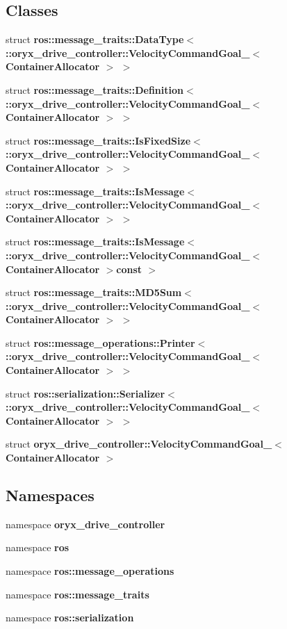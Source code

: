 \subsection*{\-Classes}
\begin{DoxyCompactItemize}
\item 
struct {\bf ros\-::message\-\_\-traits\-::\-Data\-Type$<$ \-::oryx\-\_\-drive\-\_\-controller\-::\-Velocity\-Command\-Goal\-\_\-$<$ Container\-Allocator $>$ $>$}
\item 
struct {\bf ros\-::message\-\_\-traits\-::\-Definition$<$ \-::oryx\-\_\-drive\-\_\-controller\-::\-Velocity\-Command\-Goal\-\_\-$<$ Container\-Allocator $>$ $>$}
\item 
struct {\bf ros\-::message\-\_\-traits\-::\-Is\-Fixed\-Size$<$ \-::oryx\-\_\-drive\-\_\-controller\-::\-Velocity\-Command\-Goal\-\_\-$<$ Container\-Allocator $>$ $>$}
\item 
struct {\bf ros\-::message\-\_\-traits\-::\-Is\-Message$<$ \-::oryx\-\_\-drive\-\_\-controller\-::\-Velocity\-Command\-Goal\-\_\-$<$ Container\-Allocator $>$ $>$}
\item 
struct {\bf ros\-::message\-\_\-traits\-::\-Is\-Message$<$ \-::oryx\-\_\-drive\-\_\-controller\-::\-Velocity\-Command\-Goal\-\_\-$<$ Container\-Allocator $>$const  $>$}
\item 
struct {\bf ros\-::message\-\_\-traits\-::\-M\-D5\-Sum$<$ \-::oryx\-\_\-drive\-\_\-controller\-::\-Velocity\-Command\-Goal\-\_\-$<$ Container\-Allocator $>$ $>$}
\item 
struct {\bf ros\-::message\-\_\-operations\-::\-Printer$<$ \-::oryx\-\_\-drive\-\_\-controller\-::\-Velocity\-Command\-Goal\-\_\-$<$ Container\-Allocator $>$ $>$}
\item 
struct {\bf ros\-::serialization\-::\-Serializer$<$ \-::oryx\-\_\-drive\-\_\-controller\-::\-Velocity\-Command\-Goal\-\_\-$<$ Container\-Allocator $>$ $>$}
\item 
struct {\bf oryx\-\_\-drive\-\_\-controller\-::\-Velocity\-Command\-Goal\-\_\-$<$ Container\-Allocator $>$}
\end{DoxyCompactItemize}
\subsection*{\-Namespaces}
\begin{DoxyCompactItemize}
\item 
namespace {\bf oryx\-\_\-drive\-\_\-controller}
\item 
namespace {\bf ros}
\item 
namespace {\bf ros\-::message\-\_\-operations}
\item 
namespace {\bf ros\-::message\-\_\-traits}
\item 
namespace {\bf ros\-::serialization}
\end{DoxyCompactItemize}
